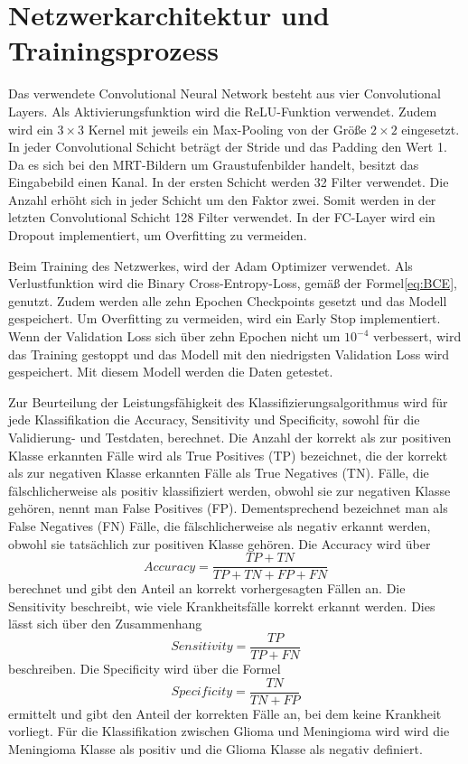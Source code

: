 \section{Netzwerkarchitektur und Trainingsprozess}
Das verwendete Convolutional Neural Network besteht aus vier Convolutional Layers. Als Aktivierungsfunktion wird die ReLU-Funktion verwendet.
Zudem wird ein $3 \times 3$ Kernel mit jeweils ein Max-Pooling von der Größe $2 \times 2$ eingesetzt. 
In jeder Convolutional Schicht beträgt der Stride und das Padding den Wert 1.
Da es sich bei den MRT-Bildern um Graustufenbilder handelt, besitzt das Eingabebild einen Kanal. 
In der ersten Schicht werden 32 Filter verwendet.
Die Anzahl erhöht sich in jeder Schicht um den Faktor zwei.
Somit werden in der letzten Convolutional Schicht 128 Filter verwendet.
In der FC-Layer wird ein Dropout implementiert, um Overfitting zu vermeiden.

Beim Training des Netzwerkes, wird der Adam Optimizer verwendet. 
Als Verlustfunktion wird die Binary Cross-Entropy-Loss, gemäß der Formel\ref{eq:BCE}, genutzt.
Zudem werden alle zehn Epochen Checkpoints gesetzt und das Modell gespeichert.
Um Overfitting zu vermeiden, wird ein Early Stop implementiert. Wenn der Validation Loss sich über zehn Epochen nicht um $10^{-4}$
verbessert, wird das Training gestoppt und das Modell mit den niedrigsten Validation Loss wird gespeichert.
Mit diesem Modell werden die Daten getestet.

Zur Beurteilung der Leistungsfähigkeit des Klassifizierungsalgorithmus wird für jede Klassifikation die Accuracy, 
Sensitivity und Specificity, sowohl für die Validierung- und Testdaten, berechnet.
Die Anzahl der korrekt als zur positiven Klasse erkannten Fälle wird als True Positives (TP) bezeichnet, die der korrekt als zur negativen Klasse erkannten Fälle als True Negatives (TN).
Fälle, die fälschlicherweise als positiv klassifiziert werden, obwohl sie zur negativen Klasse gehören, nennt man False Positives (FP).
Dementsprechend bezeichnet man als False Negatives (FN) Fälle, die fälschlicherweise als negativ erkannt werden, obwohl sie tatsächlich zur positiven Klasse gehören.
Die Accuracy wird über
\begin{equation}
  Accuracy = \frac{TP + TN}{TP + TN + FP + FN}
\end{equation}
berechnet und gibt den Anteil an korrekt vorhergesagten Fällen an. 
Die Sensitivity beschreibt, wie viele Krankheitsfälle korrekt erkannt werden. 
Dies lässt sich über den Zusammenhang
\begin{equation}
  Sensitivity = \frac{TP}{TP + FN}
\end{equation}
beschreiben.
Die Specificity wird über die Formel
\begin{equation}
  Specificity = \frac{TN}{TN + FP}
\end{equation}
ermittelt und gibt den Anteil der korrekten Fälle an, bei dem keine Krankheit vorliegt.%
Für die Klassifikation zwischen Glioma und Meningioma wird wird die Meningioma Klasse als positiv und die Glioma Klasse als negativ definiert.

